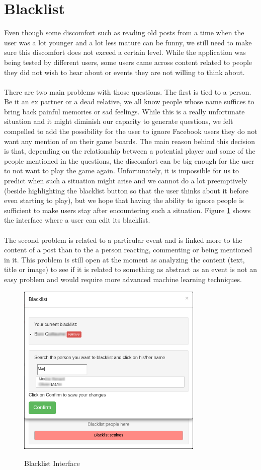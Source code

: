 \section{Blacklist}
Even though some discomfort such as reading old posts from a time when the user was a lot younger and a lot less mature can be funny, we still need to make sure this discomfort does not exceed a certain level. While the application was being tested by different users, some users came across content related to people they did not wish to hear about or events they are not willing to think about.\\\\
There are two main problems with those questions. The first is tied to a person. Be it an ex partner or a dead relative, we all know people whose name suffices to bring back painful memories or sad feelings. While this is a really unfortunate situation and it might diminish our capacity to generate questions, we felt compelled to add the possibility for the user to ignore Facebook users they do not want any mention of on their game boards. The main reason behind this decision is that, depending on the relationship between a potential player and some of the people mentioned in the questions, the discomfort can be big enough for the user to not want to play the game again. Unfortunately, it is impossible for us to predict when such a situation might arise and we cannot do a lot preemptively (beside highlighting the blacklist button so that the user thinks about it before even starting to play), but we hope that having the ability to ignore people is sufficient to make users stay after encountering such a situation. Figure \ref{fig:blacklist} shows the interface where a user can edit its blacklist.\\\\
The second problem is related to a particular event and is linked more to the content of a post than to the a person reacting, commenting or being mentioned in it. This problem is still open at the moment as analyzing the content (text, title or image) to see if it is related to something as abstract as an event is not an easy problem and would require more advanced machine learning techniques.
\begin{figure}
\centering
{\includegraphics[width=3.5in]{images/blacklist.png}}
\caption{Blacklist Interface}
\label{fig:blacklist}
\end{figure}

